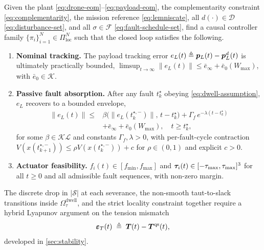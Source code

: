 \begin{definition}
\label{def:problem}
Given the plant \eqref{eq:drone-eom}--\eqref{eq:payload-eom}, the complementarity constraint \eqref{eq:complementarity}, the mission reference \eqref{eq:lemniscate}, all $d(\cdot)\in\mathcal{D}$ \eqref{eq:disturbance-set}, and all $\sigma\in\mathcal{F}$ \eqref{eq:fault-schedule-set}, find a causal controller family $\{\pi_i\}_{i=1}^N\in\Pi_{\mathrm{loc}}^N$ such that the closed loop satisfies the following.
\begin{enumerate}[label=\textbf{P\arabic*},leftmargin=2.0em]
  \item \textbf{Nominal tracking.} The payload tracking error $e_L(t)\triangleq\boldsymbol{p}_L(t)-\boldsymbol{p}_L^d(t)$ is ultimately practically bounded,
    $\limsup_{t\to\infty}\|e_L(t)\|\le\bar e_\infty+\bar e_0(W_{\max})$, with $\bar e_0\in\mathcal{K}$.
    \label{eq:nominal-practical-bound}
  \item \textbf{Passive fault absorption.} After any fault $t_k^\star$ obeying \eqref{eq:dwell-assumption}, $e_L$ recovers to a bounded envelope,
    \begin{align}
    \label{eq:recovery-bound}
      \|e_L(t)\| \le
        &\beta\bigl(\|e_L(t_k^{\star,-})\|,\,t-t_k^\star\bigr)
         + \Gamma_f\,e^{-\lambda(t-t_k^\star)}\\
        &+ \bar e_\infty + \bar e_0(W_{\max}),\quad t\ge t_k^\star,\nonumber
    \end{align}
    for some $\beta\in\mathcal{KL}$ and constants $\Gamma_f,\lambda>0$, with per-fault-cycle contraction $V(x(t_{k+1}^{\star,-}))\le\rho V(x(t_k^{\star,-}))+c$ for $\rho\in(0,1)$ and explicit $c>0$.
  \item \textbf{Actuator feasibility.} $f_i(t)\in[f_{\min},f_{\max}]$ and $\boldsymbol{\tau}_i(t)\in[-\tau_{\max},\tau_{\max}]^3$ for all $t\ge 0$ and all admissible fault sequences, with non-zero margin.
\end{enumerate}
\end{definition}

The discrete drop in $|\mathcal{S}|$ at each severance, the non-smooth taut-to-slack transitions inside $\Omega_\tau^{\mathrm{dwell}}$, and the strict locality constraint together require a hybrid Lyapunov argument on the tension mismatch
\begin{equation}
  \boldsymbol{\varepsilon}_T(t) \;\triangleq\; \boldsymbol{T}(t) - \boldsymbol{T}^{\mathrm{qs}}(t),
  \label{eq:tension-error-state}
\end{equation}
developed in \cref{sec:stability}.



